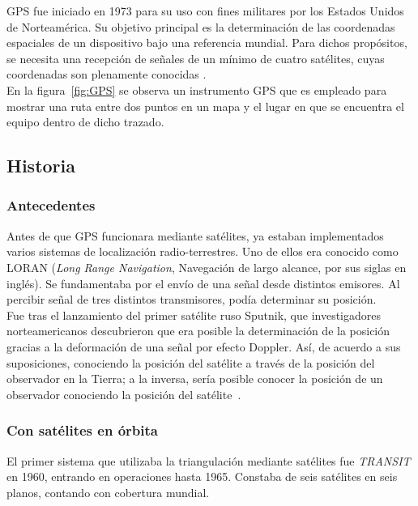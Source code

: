 
GPS fue iniciado en 1973 para su uso con fines militares por los Estados Unidos de Norteamérica. Su objetivo principal es la determinación de las coordenadas espaciales de un dispositivo bajo una referencia mundial. Para dichos propósitos, se necesita una recepción de señales de un mínimo de cuatro satélites, cuyas coordenadas son plenamente conocidas \citep{huerta2005gps}.\\

En la figura~\ref{fig:GPS} se observa un instrumento GPS que es empleado para mostrar una ruta entre dos puntos en un mapa y el lugar en que se encuentra el equipo dentro de dicho trazado.

\subsection{Historia}

\subsubsection{Antecedentes}
Antes de que GPS funcionara mediante satélites, ya estaban implementados varios sistemas de localización radio-terrestres. Uno de ellos era conocido como LORAN (\textit{Long Range Navigation}, Navegación de largo alcance, por sus siglas en inglés). Se fundamentaba por el envío de una señal desde distintos emisores. Al percibir señal de tres distintos transmisores, podía determinar su posición. \\

Fue tras el lanzamiento del primer satélite ruso Sputnik, que investigadores norteamericanos descubrieron que era posible la determinación de la posición gracias a la deformación de una señal por efecto Doppler. Así, de acuerdo a sus suposiciones, conociendo la posición del satélite a través de la posición del observador en la Tierra; a la inversa, sería posible conocer la posición de un observador conociendo la posición del satélite~\citep{termal2014prototipo}.

\subsubsection{Con satélites en órbita}
El primer sistema que utilizaba la triangulación mediante satélites fue \textit{TRANSIT} en 1960, entrando en operaciones hasta 1965. Constaba de seis satélites en seis planos, contando con cobertura mundial. \\

